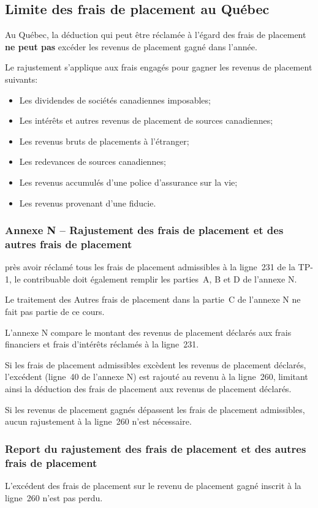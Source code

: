 \subsection{Limite des frais de placement au Québec}
Au Québec, la déduction qui peut être réclamée à l'égard des frais de placement \textbf{ne peut pas} excéder les revenus de placement gagné dans l'année. 

Le rajustement s'applique aux frais engagés pour gagner les revenus de placement suivants:
\begin{itemize}
	\item Les dividendes de sociétés canadiennes imposables;
	\item Les intérêts et autres revenus de placement de sources canadiennes;
	\item Les revenus bruts de placements à l'étranger;
	\item Les redevances de sources canadiennes;
	\item Les revenus accumulés d'une police d'assurance sur la vie;
	\item Les revenus provenant d'une fiducie.
\end{itemize}

\subsubsection{Annexe N -- Rajustement des frais de placement et des autres frais de placement}
près avoir réclamé tous les frais de placement admissibles à la ligne~231 de la TP-1, le contribuable doit également remplir les parties~A, B et D de l'annexe N.

Le traitement des \og Autres frais de placement \fg{} dans la partie~C de l'annexe N ne fait pas partie de ce cours.

L'annexe N compare le montant des revenus de placement déclarés aux frais financiers et frais d'intérêts réclamés à la ligne~231.

Si les frais de placement admissibles excèdent les revenus de placement déclarés, l'excédent (ligne~40 de l'annexe N) est rajouté au revenu à la ligne~260, limitant ainsi la déduction des frais de placement aux revenus de placement déclarés.

Si les revenus de placement gagnés dépassent les frais de placement admissibles, aucun rajustement à la ligne~260 n'est nécessaire.

\subsubsection{Report du rajustement des frais de placement et des autres frais de placement}
L'excédent des frais de placement sur le revenu de placement gagné inscrit à la ligne~260 n'est pas perdu. 

